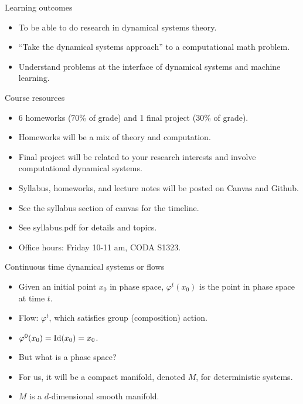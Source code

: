 \documentclass[final]{beamer}
\begin{document}
	\begin{frame}{Learning outcomes}
	\begin{itemize}
		\item To be able to do research in dynamical systems theory.
		\item ``Take the dynamical systems approach'' to a computational math problem.
		\pause
		\item Understand problems at the interface of dynamical systems and machine learning.

	\end{itemize}

\end{frame}
	\begin{frame}{Course resources}
		\begin{itemize}
			\item 6 homeworks (70\% of grade) and 1 final project (30\% of grade).
			\pause
			\item Homeworks will be a mix of theory and computation.
			\pause
			\item Final project will be related to your research interests and involve computational dynamical systems.
			\pause
			\item Syllabus, homeworks, and lecture notes will be posted on Canvas and Github.
			\pause
			\item See the syllabus section of canvas for the timeline.
			\pause
			\item See syllabus.pdf for details and topics.
			\pause
			\item Office hours: Friday 10-11 am, CODA S1323.

		\end{itemize}
	\end{frame}

	\begin{frame}{Continuous time dynamical systems or flows}
	\begin{itemize}
		\item Given an initial point $x_0$ in phase space, $\varphi^t(x_0)$ is the point in phase space at time $t$.
		\pause
		\item Flow: $\varphi^t$, which satisfies group (composition) action.
		\pause
		\item $\varphi^0(x_0) = {\rm Id}(x_0) = x_0$.
		\pause
		\item But what is a phase space?
		\pause
		\item For us, it will be a compact manifold, denoted $M$, for deterministic systems.
		\pause 
		\item $M$ is a $d$-dimensional smooth manifold.

	\end{itemize}
	\end{frame}
\end{document}
